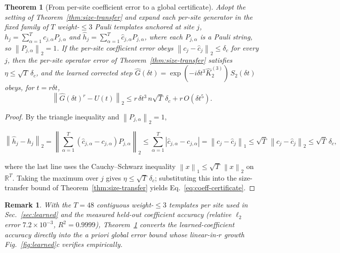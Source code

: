 \documentclass[aps,prxquantum,reprint,superscriptaddress,nofootinbib,amsmath,amssymb]{revtex4-2}
\newcommand{\norm}[1]{\left\lVert #1 \right\rVert}
\newcommand{\abs}[1]{\left\lvert #1 \right\rvert}
\newcommand{\dt}{\delta t}
\newtheorem{theorem}{Theorem}
\newtheorem{remark}{Remark}
\begin{document}
\begin{theorem}[From per-site coefficient error to a global certificate]
\label{thm:coeff-certificate}
Adopt the setting of Theorem~\ref{thm:size-transfer} and expand each per-site generator in the fixed family of $T$ weight-$\leq3$ Pauli templates anchored at site $j$, $h_j=\sum_{\alpha=1}^{T}c_{j,\alpha}P_{j,\alpha}$ and $\widehat h_j=\sum_{\alpha=1}^{T}\widehat c_{j,\alpha}P_{j,\alpha}$, where each $P_{j,\alpha}$ is a Pauli string, so $\norm{P_{j,\alpha}}_2=1$. If the per-site coefficient error obeys $\norm{c_j-\widehat c_j}_2\leq\delta_c$ for every $j$, then the per-site operator error of Theorem~\ref{thm:size-transfer} satisfies $\eta\leq\sqrt{T}\,\delta_c$, and the learned corrected step $\widehat G(\dt)=\exp(-i\dt^3\widehat K_2^{(3)})\,S_2(\dt)$ obeys, for $t=r\dt$,
\begin{equation}
    \norm{\widehat G(\dt)^r-U(t)}_2\leq r\,\dt^3\,n\sqrt{T}\,\delta_c+r\,O(\dt^5).
    \label{eq:coeff-certificate}
\end{equation}
\end{theorem}

\begin{proof}
By the triangle inequality and $\norm{P_{j,\alpha}}_2=1$,
\begin{widetext}
\begin{equation*}
    \norm{\widehat h_j-h_j}_2=\norm{\sum_{\alpha=1}^{T}(\widehat c_{j,\alpha}-c_{j,\alpha})P_{j,\alpha}}_2\leq\sum_{\alpha=1}^{T}\abs{\widehat c_{j,\alpha}-c_{j,\alpha}}=\norm{c_j-\widehat c_j}_1\leq\sqrt{T}\,\norm{c_j-\widehat c_j}_2\leq\sqrt{T}\,\delta_c,
\end{equation*}
\end{widetext}
where the last line uses the Cauchy--Schwarz inequality $\norm{x}_1\leq\sqrt{T}\,\norm{x}_2$ on $\mathbb{R}^T$. Taking the maximum over $j$ gives $\eta\leq\sqrt{T}\,\delta_c$; substituting this into the size-transfer bound of Theorem~\ref{thm:size-transfer} yields Eq.~\eqref{eq:coeff-certificate}.
\end{proof}

\begin{remark}
With the $T=48$ contiguous weight-$\leq3$ templates per site used in Sec.~\ref{sec:learned} and the measured held-out coefficient accuracy (relative $\ell_2$ error $7.2\times10^{-3}$, $R^2=0.9999$), Theorem~\ref{thm:coeff-certificate} converts the learned-coefficient accuracy directly into the \emph{a priori} global error bound whose linear-in-$r$ growth Fig.~\ref{fig:learned}c verifies empirically.
\end{remark}
\end{document}
